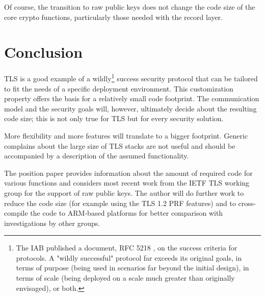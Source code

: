 \documentclass[a4paper, 10pt]{IEEEtran}
\begin{document}
Of course, the transition to raw public keys does not change the code size of the core crypto functions, particularly those needed with the record layer. 

\section{Conclusion}
TLS is a good example of a wildly\footnote{The IAB published a document, RFC 5218 \cite{rfc5218}, on the success criteria for protocols.  A "wildly successful" protocol far exceeds its original goals, in
   terms of purpose (being used in scenarios far beyond the initial
   design), in terms of scale (being deployed on a scale much greater
   than originally envisaged), or both.} success security protocol that can be tailored to fit the needs of a specific deployment environment. This customization property offers the basis for a relatively small code footprint. The communication model and the security goals will, however, ultimately decide about the resulting code size; this is not only true for TLS but for every security solution. 

More flexibility and more features will translate to a bigger footprint. Generic complains about the large size of TLS stacks are not useful and should be accompanied by a description of the assumed functionality.  

The position paper provides information about the amount of required code for various functions and considers most recent work from the IETF TLS working group for the support of raw public keys. The author will do further work to reduce the code size (for example using the TLS 1.2 PRF features) and to cross-compile the code to ARM-based platforms for better comparison with investigations by other groups.


% 

\end{document}
